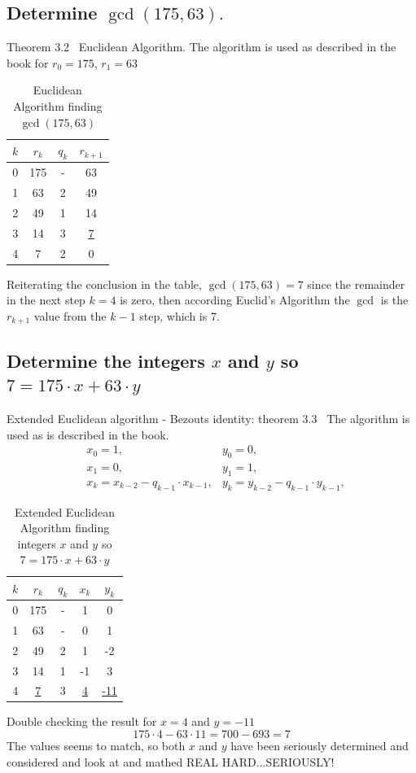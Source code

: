 \documentclass[12pt]{article}
\begin{document}
\subsection*{Determine $\gcd(175,63).$}
Theorem 3.2~\cite{Algebra} Euclidean Algorithm.
The algorithm is used as described in the book for $r_0 = 175$, $r_1 = 63$
\begin{table}[H]
\centering
\begin{tabular}{|c|c|c|c|}
\hline
$k$ & $r_k$ & $q_k$ & $r_{k+1}$ \\ \hline
0 & 175 & - & 63 \\ \hline 
1 & 63  & 2 & 49 \\ \hline
2 & 49  & 1 & 14 \\ \hline
3 & 14  & 3 & \underline{\underline{7}} \\ \hline
4 & 7   & 2 & 0 \\ \hline  
\end{tabular}
\vspace{0.2cm}
\caption{Euclidean Algorithm finding $\gcd(175, 63)$}
\label{tab:euclid}
\end{table}
\noindent Reiterating the conclusion in the table, $\gcd(175, 63) = 7$ since the remainder in the next
 step $k = 4$ is zero, then according Euclid's Algorithm the $\gcd$ is the $r_{k+1}$ value from the $k-1$ step, which is 7.




\subsection*{Determine the integers $x$ and $y$ so $7 = 175\cdot x + 63 \cdot y$}
Extended Euclidean algorithm - Bezouts identity: theorem 3.3~\cite{Algebra}
The algorithm  is used as is described in the book.
\begin{align*}
    &x_0 = 1,  &y_0 = 0, \\
    &x_1 = 0,  &y_1 = 1, \\
    &x_k = x_{k-2} - q_{k-1} \cdot x_{k-1},  &y_k = y_{k-2} - q_{k-1} \cdot y_{k-1},
\end{align*}
\begin{table}[H]
\centering
\begin{tabular}{|c|c|c|c|c|}
\hline
$k$ & $r_k$ & $q_k$ & $x_k$ & $y_k$ \\ \hline
0 & 175 & - & 1 & 0 \\ \hline
1 & 63  & - & 0 & 1 \\ \hline
2 & 49  & 2 & 1 & -2 \\ \hline
3 & 14  & 1 & -1 & 3 \\ \hline
4 & \underline{\underline{7}} & 3 & \underline{\underline{4}} & \underline{\underline{-11}} \\ \hline
\end{tabular}
\vspace{0.2cm}
\caption{Extended Euclidean Algorithm finding integers $x$ and $y$ so $7 = 175\cdot x + 63 \cdot y$}
\label{tab:extended_euclid}
\end{table}
Double checking the result for $x = 4$ and $y= -11$
\[
175 \cdot 4 - 63 \cdot 11 = 700 - 693 = 7
\]
The values seems to match, so both $x$ and $y$ have been seriously determined and considered and look at and mathed REAL HARD...SERIOUSLY!
\end{document}
